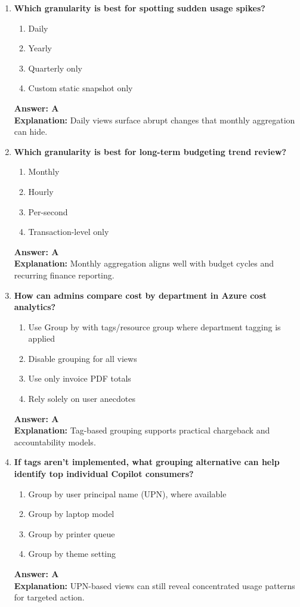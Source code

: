 \documentclass[10pt]{article}
\begin{document}
\begin{enumerate}[leftmargin=*]
\item \textbf{Which granularity is best for spotting sudden usage spikes?}
\begin{enumerate}[label=\Alph*.]
  \item Daily
  \item Yearly
  \item Quarterly only
  \item Custom static snapshot only
\end{enumerate}
\textbf{Answer: A}\\
\textbf{Explanation:} Daily views surface abrupt changes that monthly aggregation can hide.

\item \textbf{Which granularity is best for long-term budgeting trend review?}
\begin{enumerate}[label=\Alph*.]
  \item Monthly
  \item Hourly
  \item Per-second
  \item Transaction-level only
\end{enumerate}
\textbf{Answer: A}\\
\textbf{Explanation:} Monthly aggregation aligns well with budget cycles and recurring finance reporting.

\item \textbf{How can admins compare cost by department in Azure cost analytics?}
\begin{enumerate}[label=\Alph*.]
  \item Use Group by with tags/resource group where department tagging is applied
  \item Disable grouping for all views
  \item Use only invoice PDF totals
  \item Rely solely on user anecdotes
\end{enumerate}
\textbf{Answer: A}\\
\textbf{Explanation:} Tag-based grouping supports practical chargeback and accountability models.

\item \textbf{If tags aren’t implemented, what grouping alternative can help identify top individual Copilot consumers?}
\begin{enumerate}[label=\Alph*.]
  \item Group by user principal name (UPN), where available
  \item Group by laptop model
  \item Group by printer queue
  \item Group by theme setting
\end{enumerate}
\textbf{Answer: A}\\
\textbf{Explanation:} UPN-based views can still reveal concentrated usage patterns for targeted action.


\end{enumerate}
\end{document}
